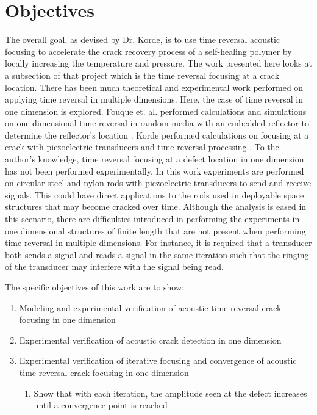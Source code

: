 \section{Objectives}
The overall goal, as devised by Dr. Korde, is to use time reversal acoustic focusing to accelerate the crack recovery process of a self-healing polymer by locally increasing the temperature and pressure. The work presented here looks at a subsection of that project which is the time reversal focusing at a crack location. There has been much theoretical and experimental work performed on applying time reversal in multiple dimensions. Here, the case of time reversal in one dimension is explored. Fouque et. al. performed calculations and simulations on one dimensional time reversal in random media with an embedded reflector to determine the reflector's location \cite{Fouque2006}. Korde performed calculations on focusing at a crack with piezoelectric transducers and time reversal processing \cite{Fehrman2012}. To the author's knowledge, time reversal focusing at a defect location in one dimension has not been performed experimentally. In this work experiments are performed on circular steel and nylon rods with piezoelectric transducers to send and receive signals. This could have direct applications to the rods used in deployable space structures that may become cracked over time. Although the analysis is eased in this scenario, there are difficulties introduced in performing the experiments in one dimensional structures of finite length that are not present when performing time reversal in multiple dimensions. For instance, it is required that a transducer both sends a signal and reads a signal in the same iteration such that the ringing of the transducer may interfere with the signal being read.\newline

The specific objectives of this work are to show:
\begin{enumerate}
\item Modeling and experimental verification of acoustic time reversal crack focusing in one dimension
\item Experimental verification of acoustic crack detection in one dimension
\item Experimental verification of iterative focusing and convergence of acoustic time reversal crack focusing in one dimension
	\begin{enumerate} 
	\item Show that with each iteration, the amplitude seen at the defect increases until a convergence point is reached
	\end{enumerate}

\end{enumerate}